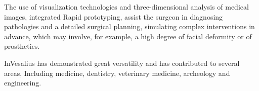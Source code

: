 
The use of visualization technologies and three-dimensional analysis of medical images, integrated
Rapid prototyping, assist the surgeon in diagnosing pathologies and a detailed surgical planning, simulating complex interventions in advance, which may involve, for example, a high degree of facial deformity or
of prosthetics.


InVesalius has demonstrated great versatility and has contributed to several areas,
Including medicine, dentistry, veterinary medicine, archeology and engineering.
		
\noindent
